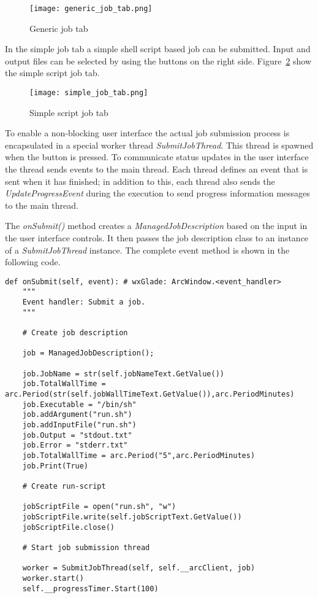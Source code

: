 \documentclass{book}
\newcommand{\python}[1]{\textbf{\sffamily{#1 }}}
\begin{document}
\begin{figure}[htp]
\centering
\texttt{[image: generic\_job\_tab.png]}
\caption{Generic job tab}\label{fig:generic_job_tab}
\end{figure}		

In the simple job tab a simple shell script based job can be submitted. Input and output files can be selected by using the buttons on the right side. Figure~\ref{fig:simple_job_tab} show the simple script job tab.

\begin{figure}[htp]
\centering
\texttt{[image: simple\_job\_tab.png]}
\caption{Simple script job tab}\label{fig:simple_job_tab}
\end{figure}		

To enable a non-blocking user interface the actual job submission process is encapsulated in a special worker thread \textit{SubmitJobThread}. This thread is spawned when the \python{Submit} button is pressed. To communicate status updates in the user interface the thread sends events to the main thread. Each thread defines an event that is sent when it has finished; in addition to this, each thread also sends the \textit{UpdateProgressEvent} during the execution to send progress information messages to the main thread.

The \textit{onSubmit()} method creates a \textit{ManagedJobDescription} based on the input in the user interface controls. It then passes the job description class to an instance of a \textit{SubmitJobThread} instance. The complete event method is shown in the following code.

\begin{shaded}
\begin{verbatim}
def onSubmit(self, event): # wxGlade: ArcWindow.<event_handler>
    """
    Event handler: Submit a job.
    """
    
    # Create job description
    
    job = ManagedJobDescription();
    
    job.JobName = str(self.jobNameText.GetValue())
    job.TotalWallTime = arc.Period(str(self.jobWallTimeText.GetValue()),arc.PeriodMinutes)
    job.Executable = "/bin/sh"
    job.addArgument("run.sh")
    job.addInputFile("run.sh")
    job.Output = "stdout.txt"
    job.Error = "stderr.txt"
    job.TotalWallTime = arc.Period("5",arc.PeriodMinutes)
    job.Print(True)
    
    # Create run-script
    
    jobScriptFile = open("run.sh", "w")
    jobScriptFile.write(self.jobScriptText.GetValue())
    jobScriptFile.close()
    
    # Start job submission thread
    
    worker = SubmitJobThread(self, self.__arcClient, job)
    worker.start()
    self.__progressTimer.Start(100)
\end{verbatim}
\end{shaded}
\end{document}
